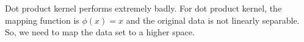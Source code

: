 \begin{answer}
Dot product kernel performs extremely badly. For dot product kernel, the mapping function is $\phi(x) = x$ and the original data is not linearly separable. So, we need to map the data set to a higher space.
\end{answer}

